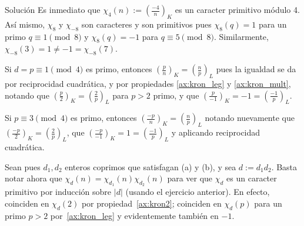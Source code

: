 \documentclass[handout, 10pt]{beamer}
\begin{document}
\begin{frame}{Solución}
	Es inmediato que $\chi_4(n) := \left( \frac{-4}{n} \right)_K$ es un caracter primitivo módulo 4.
	\pause
	Así mismo, $\chi_8$ y $\chi_{-8}$ son caracteres y son primitivos pues $\chi_8(q) = 1$ para un primo $q \equiv 1 \pmod 8$ y
	$\chi_8(q) = -1$ para $q \equiv 5 \pmod 8$.
	Similarmente, $\chi_{-8}(3) = 1 \ne -1 = \chi_{-8}(7)$.

	\pause
	Si $d = p \equiv 1 \pmod 4$ es primo, entonces $\left( \frac{p}{n} \right)_K = \left( \frac{n}{p} \right)_L$ pues la igualdad
	se da por reciprocidad cuadrática, y por propiedades \ref{ax:kron_leg} y \ref{ax:kron_mult},
	notando que $\left( \frac{p}{2} \right)_K = \left( \frac{2}{p} \right)_L$ para $p > 2$ primo, y que $\left( \frac{p}{-1} \right)_K =
	-1 = \left( \frac{-1}{p} \right)_L$.

	\pause
	Si $p \equiv 3 \pmod 4$ es primo, entonces $\left( \frac{-p}{n} \right)_K = \left( \frac{n}{p} \right)_L$ notando nuevamente que
	$\left( \frac{-p}{2} \right)_K = \left( \frac{2}{p} \right)_L$, que $\left( \frac{-p}{-1} \right)_K = 1 = \left( \frac{-1}{p}
	\right)_L$ y aplicando reciprocidad cuadrática.

	\pause
	Sean pues $d_1, d_2$ enteros coprimos que satisfagan (a) y (b), y sea $d := d_1d_2$.
	Basta notar ahora que $\chi_d(n) = \chi_{d_1}(n)\chi_{d_2}(n)$ para ver que $\chi_d$ es un caracter primitivo por inducción sobre
	$|d|$ (usando el ejercicio anterior).
	\pause
	En efecto, coinciden en $\chi_d(2)$ por propiedad~\ref{ax:kron2};
	coinciden en $\chi_d(p)$ para un primo $p > 2$ por~\ref{ax:kron_leg} y evidentemente también en $-1$.
\end{frame}
\end{document}
